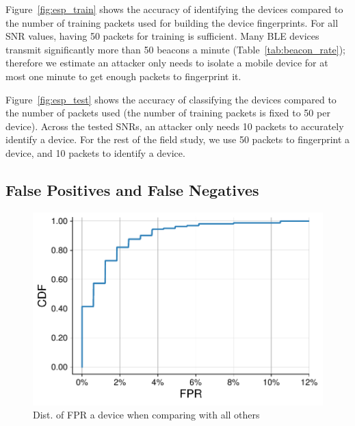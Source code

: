Figure~\ref{fig:esp_train} shows the accuracy of identifying the
devices compared to the number of training packets used for building the device fingerprints.
For all SNR values, having 50 packets for training is sufficient. Many BLE devices transmit
significantly more than 50 beacons a minute (Table~\ref{tab:beacon_rate});
therefore 
we estimate an attacker only needs to isolate
a mobile device for at most one minute to get enough packets to fingerprint it.


Figure~\ref{fig:esp_test} shows the accuracy of classifying the devices
compared to the number of packets used (the number of training packets is fixed
to 50 per device). 
Across the tested SNRs, an attacker only needs 10 packets to accurately identify a device.
For the rest of the field study, we use 50 packets to fingerprint a device, and
10 packets to identify a device.






\subsection{False Positives and False Negatives}
\label{sec:results:field}

\begin{figure}
    \centering
    \includegraphics[width = \linewidth]{bletracking/plots/fpr_cdf2.pdf} 
    \caption{Dist. of FPR a device when comparing with all others}
    \label{fig:fpr_cdf}
\end{figure}


